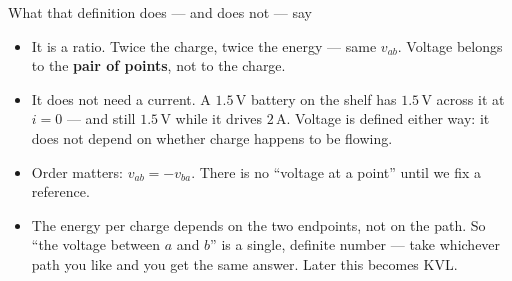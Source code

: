 \documentclass[11pt,aspectratio=169]{beamer}
\newcommand{\uni}[1]{\,\mathrm{#1}}
\newcommand{\A}{\uni{A}} \newcommand{\V}{\uni{V}}
\begin{document}
\begin{frame}{What that definition does --- and does not --- say}
  \vfill
  \begin{itemize}\itemsep1.1em
    \item It is a \alert{ratio}. Twice the charge, twice the energy --- same $v_{ab}$.
          Voltage belongs to the \textbf{pair of points}, not to the charge.
    \item It does \alert{not need a current}. A $1.5\V$ battery on the shelf has
          $1.5\V$ across it at $i = 0$ --- and still $1.5\V$ while it drives $2\A$.
          Voltage is defined either way: it does not depend on whether charge happens
          to be flowing.
    \item \alert{Order matters}: $v_{ab} = -v_{ba}$. There is no ``voltage at a point''
          until we fix a reference.
    \item The energy per charge depends on the two endpoints, \alert{not on the path}.
          So ``the voltage between $a$ and $b$'' is a \alert{single, definite number} ---
          take whichever path you like and you get the same answer. Later this becomes
          KVL.
  \end{itemize}
  \vfill
\end{frame}
\end{document}
